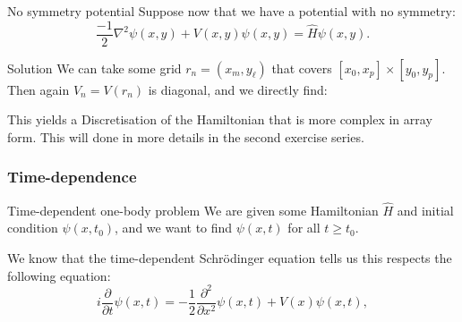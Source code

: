 \documentclass[a4paper]{article}
\begin{document}
\begin{parag}{No symmetry potential}
    Suppose now that we have a potential with no symmetry: 
    \[\frac{-1}{2} \nabla^2 \psi\left(x, y\right) + V\left(x, y\right) \psi\left(x, y\right) = \hat{H} \psi\left(x, y\right).\]
    
    \begin{subparag}{Solution}
        We can take some grid $r_n = \left(x_m, y_{\ell}\right)$ that covers $\left[x_0, x_p\right] \times \left[y_0, y_p\right]$. Then again $V_n = V\left(r_n\right)$ is diagonal, and we directly find:
        
        This yields a Discretisation of the Hamiltonian that is more complex in array form. This will done in more details in the second exercise series.
    \end{subparag}
\end{parag}

\subsubsection{Time-dependence}

\begin{parag}{Time-dependent one-body problem}
    We are given some Hamiltonian $\hat{H}$ and initial condition $\psi\left(x, t_0\right)$, and we want to find $\psi\left(x, t\right)$ for all $t \geq t_0$.

    We know that the time-dependent Schrödinger equation tells us this respects the following equation: 
    \[i \frac{\partial}{\partial t} \psi\left(x, t\right) = -\frac{1}{2} \frac{\partial^2}{\partial x^2} \psi\left(x, t\right) + V\left(x\right) \psi\left(x, t\right),\]
\end{parag}
\end{document}

